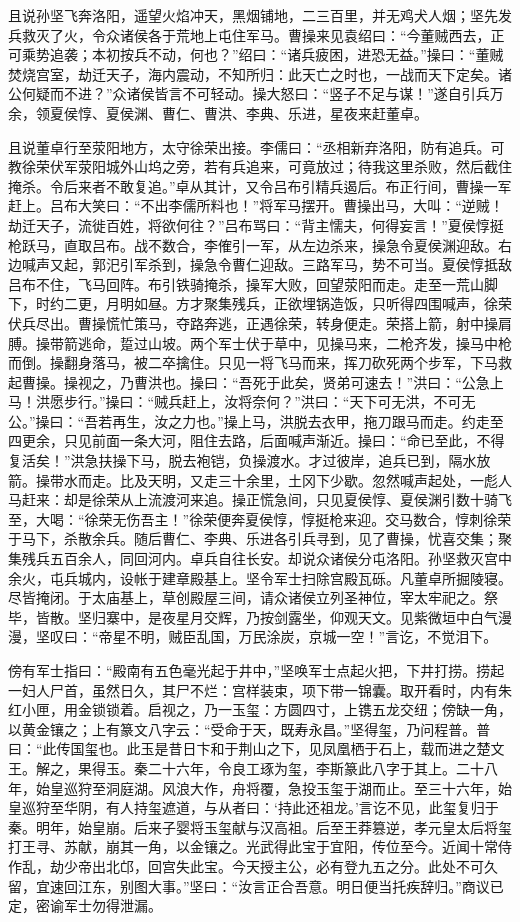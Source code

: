 且说孙坚飞奔洛阳，遥望火焰冲天，黑烟铺地，二三百里，并无鸡犬人烟；坚先发兵救灭了火，令众诸侯各于荒地上屯住军马。曹操来见袁绍曰：“今董贼西去，正可乘势追袭；本初按兵不动，何也？”绍曰：“诸兵疲困，进恐无益。”操曰：“董贼焚烧宫室，劫迁天子，海内震动，不知所归：此天亡之时也，一战而天下定矣。诸公何疑而不进？”众诸侯皆言不可轻动。操大怒曰：“竖子不足与谋！”遂自引兵万余，领夏侯惇、夏侯渊、曹仁、曹洪、李典、乐进，星夜来赶董卓。

且说董卓行至荥阳地方，太守徐荣出接。李儒曰：“丞相新弃洛阳，防有追兵。可教徐荣伏军荥阳城外山坞之旁，若有兵追来，可竟放过；待我这里杀败，然后截住掩杀。令后来者不敢复追。”卓从其计，又令吕布引精兵遏后。布正行间，曹操一军赶上。吕布大笑曰：“不出李儒所料也！”将军马摆开。曹操出马，大叫：“逆贼！劫迁天子，流徙百姓，将欲何往？”吕布骂曰：“背主懦夫，何得妄言！”夏侯惇挺枪跃马，直取吕布。战不数合，李傕引一军，从左边杀来，操急令夏侯渊迎敌。右边喊声又起，郭汜引军杀到，操急令曹仁迎敌。三路军马，势不可当。夏侯惇抵敌吕布不住，飞马回阵。布引铁骑掩杀，操军大败，回望荥阳而走。走至一荒山脚下，时约二更，月明如昼。方才聚集残兵，正欲埋锅造饭，只听得四围喊声，徐荣伏兵尽出。曹操慌忙策马，夺路奔逃，正遇徐荣，转身便走。荣搭上箭，射中操肩膊。操带箭逃命，踅过山坡。两个军士伏于草中，见操马来，二枪齐发，操马中枪而倒。操翻身落马，被二卒擒住。只见一将飞马而来，挥刀砍死两个步军，下马救起曹操。操视之，乃曹洪也。操曰：“吾死于此矣，贤弟可速去！”洪曰：“公急上马！洪愿步行。”操曰：“贼兵赶上，汝将奈何？”洪曰：“天下可无洪，不可无公。”操曰：“吾若再生，汝之力也。”操上马，洪脱去衣甲，拖刀跟马而走。约走至四更余，只见前面一条大河，阻住去路，后面喊声渐近。操曰：“命已至此，不得复活矣！”洪急扶操下马，脱去袍铠，负操渡水。才过彼岸，追兵已到，隔水放箭。操带水而走。比及天明，又走三十余里，土冈下少歇。忽然喊声起处，一彪人马赶来：却是徐荣从上流渡河来追。操正慌急间，只见夏侯惇、夏侯渊引数十骑飞至，大喝：“徐荣无伤吾主！”徐荣便奔夏侯惇，惇挺枪来迎。交马数合，惇刺徐荣于马下，杀散余兵。随后曹仁、李典、乐进各引兵寻到，见了曹操，忧喜交集；聚集残兵五百余人，同回河内。卓兵自往长安。却说众诸侯分屯洛阳。孙坚救灭宫中余火，屯兵城内，设帐于建章殿基上。坚令军士扫除宫殿瓦砾。凡董卓所掘陵寝。尽皆掩闭。于太庙基上，草创殿屋三间，请众诸侯立列圣神位，宰太牢祀之。祭毕，皆散。坚归寨中，是夜星月交辉，乃按剑露坐，仰观天文。见紫微垣中白气漫漫，坚叹曰：“帝星不明，贼臣乱国，万民涂炭，京城一空！”言讫，不觉泪下。

傍有军士指曰：“殿南有五色毫光起于井中，”坚唤军士点起火把，下井打捞。捞起一妇人尸首，虽然日久，其尸不烂：宫样装束，项下带一锦囊。取开看时，内有朱红小匣，用金锁锁着。启视之，乃一玉玺：方圆四寸，上镌五龙交纽；傍缺一角，以黄金镶之；上有篆文八字云：“受命于天，既寿永昌。”坚得玺，乃问程普。普曰：“此传国玺也。此玉是昔日卞和于荆山之下，见凤凰栖于石上，载而进之楚文王。解之，果得玉。秦二十六年，令良工琢为玺，李斯篆此八字于其上。二十八年，始皇巡狩至洞庭湖。风浪大作，舟将覆，急投玉玺于湖而止。至三十六年，始皇巡狩至华阴，有人持玺遮道，与从者曰：‘持此还祖龙。’言讫不见，此玺复归于秦。明年，始皇崩。后来子婴将玉玺献与汉高祖。后至王莽篡逆，孝元皇太后将玺打王寻、苏献，崩其一角，以金镶之。光武得此宝于宜阳，传位至今。近闻十常侍作乱，劫少帝出北邙，回宫失此宝。今天授主公，必有登九五之分。此处不可久留，宜速回江东，别图大事。”坚曰：“汝言正合吾意。明日便当托疾辞归。”商议已定，密谕军士勿得泄漏。

